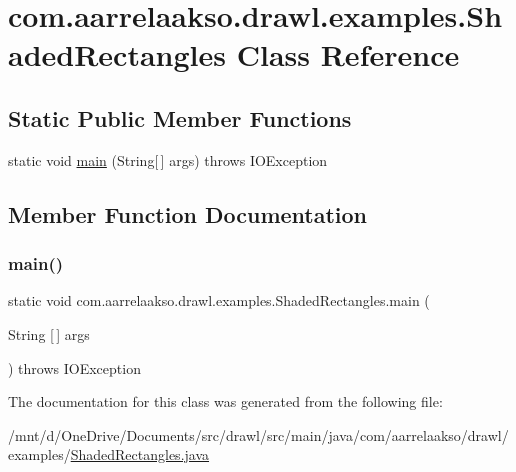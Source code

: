 \hypertarget{classcom_1_1aarrelaakso_1_1drawl_1_1examples_1_1_shaded_rectangles}{}\section{com.\+aarrelaakso.\+drawl.\+examples.\+Shaded\+Rectangles Class Reference}
\label{classcom_1_1aarrelaakso_1_1drawl_1_1examples_1_1_shaded_rectangles}
\subsection*{Static Public Member Functions}
\begin{DoxyCompactItemize}
\item 
static void \hyperlink{classcom_1_1aarrelaakso_1_1drawl_1_1examples_1_1_shaded_rectangles_a08e036088dc3ac523392c9e86ecef089}{main} (String\mbox{[}$\,$\mbox{]} args)  throws I\+O\+Exception     
\end{DoxyCompactItemize}


\subsection{Member Function Documentation}
\mbox{\label{classcom_1_1aarrelaakso_1_1drawl_1_1examples_1_1_shaded_rectangles_a08e036088dc3ac523392c9e86ecef089}} 
\subsubsection{\texorpdfstring{main()}{main()}}
{\footnotesize\ttfamily static void com.\+aarrelaakso.\+drawl.\+examples.\+Shaded\+Rectangles.\+main (\begin{DoxyParamCaption}\item[{String \mbox{[}$\,$\mbox{]}}]{args }\end{DoxyParamCaption}) throws I\+O\+Exception\hspace{0.3cm}{\ttfamily [static]}}



The documentation for this class was generated from the following file\+:\begin{DoxyCompactItemize}
\item 
/mnt/d/\+One\+Drive/\+Documents/src/drawl/src/main/java/com/aarrelaakso/drawl/examples/\hyperlink{_shaded_rectangles_8java}{Shaded\+Rectangles.\+java}\end{DoxyCompactItemize}

